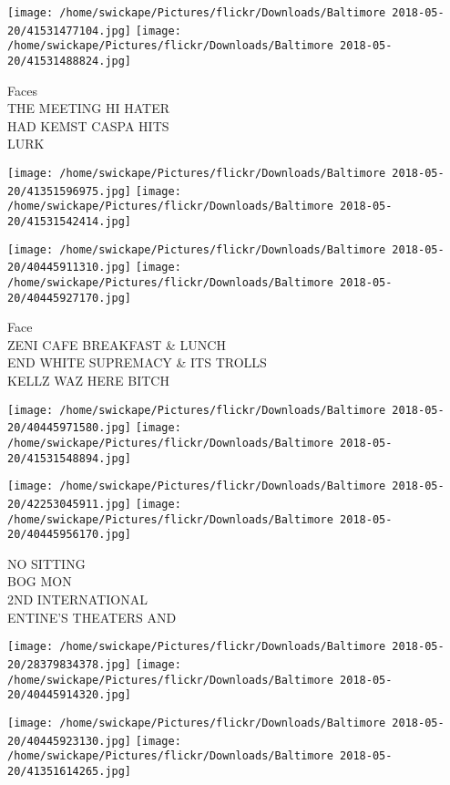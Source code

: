 \documentclass[10pt,letterpaper]{article}
\begin{document}
\texttt{[image: /home/swickape/Pictures/flickr/Downloads/Baltimore 2018-05-20/41531477104.jpg]}
\texttt{[image: /home/swickape/Pictures/flickr/Downloads/Baltimore 2018-05-20/41531488824.jpg]}

Faces\\
THE MEETING HI HATER\\
HAD KEMST CASPA HITS\\
LURK\\
\pagebreak

\texttt{[image: /home/swickape/Pictures/flickr/Downloads/Baltimore 2018-05-20/41351596975.jpg]}
\texttt{[image: /home/swickape/Pictures/flickr/Downloads/Baltimore 2018-05-20/41531542414.jpg]}

\texttt{[image: /home/swickape/Pictures/flickr/Downloads/Baltimore 2018-05-20/40445911310.jpg]}
\texttt{[image: /home/swickape/Pictures/flickr/Downloads/Baltimore 2018-05-20/40445927170.jpg]}

Face\\
ZENI CAFE BREAKFAST \& LUNCH\\
END WHITE SUPREMACY \& ITS TROLLS\\
KELLZ WAZ HERE BITCH\\
\pagebreak

\texttt{[image: /home/swickape/Pictures/flickr/Downloads/Baltimore 2018-05-20/40445971580.jpg]}
\texttt{[image: /home/swickape/Pictures/flickr/Downloads/Baltimore 2018-05-20/41531548894.jpg]}

\texttt{[image: /home/swickape/Pictures/flickr/Downloads/Baltimore 2018-05-20/42253045911.jpg]}
\texttt{[image: /home/swickape/Pictures/flickr/Downloads/Baltimore 2018-05-20/40445956170.jpg]}

NO SITTING\\
BOG MON\\
2ND INTERNATIONAL\\
ENTINE'S THEATERS AND\\
\pagebreak

\texttt{[image: /home/swickape/Pictures/flickr/Downloads/Baltimore 2018-05-20/28379834378.jpg]}
\texttt{[image: /home/swickape/Pictures/flickr/Downloads/Baltimore 2018-05-20/40445914320.jpg]}

\texttt{[image: /home/swickape/Pictures/flickr/Downloads/Baltimore 2018-05-20/40445923130.jpg]}
\texttt{[image: /home/swickape/Pictures/flickr/Downloads/Baltimore 2018-05-20/41351614265.jpg]}
\end{document}
